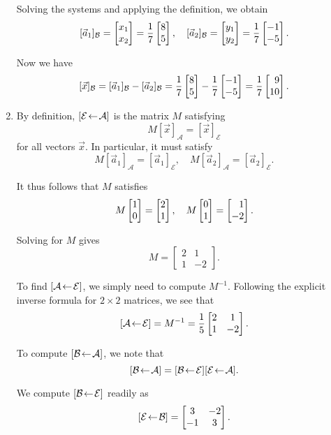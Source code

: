 \begin{exercises}
\begin{problist}
\begin{solution}
\begin{enumerate}
				Solving the systems and applying the definition, we obtain
				\[
					[\vec a_1]_{\mathcal B}=\mat{x_1\\x_2}=\frac{1}{7}\mat{8\\5},\quad
					[\vec a_2]_{\mathcal B}=\mat{y_1\\y_2}=\frac{1}{7}\mat{-1\\-5}.
				\]
				
				Now we have
				\[
					[\vec x]_{\mathcal B}=[\vec a_1]_{\mathcal B}-[\vec a_2]_{\mathcal B}=\frac{1}{7}\mat{8\\5}-\frac{1}{7}\mat{-1\\-5}=\frac{1}{7}\mat{9\\10}.
				\]
				\item By definition, $\BasisChange{\mathcal A}{\mathcal E}$ is the matrix $M$ satisfying
				\[
					M[\vec x]_{\mathcal A}=[\vec x]_{\mathcal E}
				\]
				for all vectors $\vec x$. In particular, it must satisfy
				\[
					M[\vec a_1]_{\mathcal A}=[\vec a_1]_{\mathcal E},\quad
					M[\vec a_2]_{\mathcal A}=[\vec a_2]_{\mathcal E}.
				\]
				
				It thus follows that $M$ satisfies
				\[
					M\mat{1\\0}=\mat{2\\1},\quad
					M\mat{0\\1}=\mat{1\\-2}.
				\]
				
				Solving for $M$ gives
				\[
					M=
					\begin{bmatrix}
						2 & 1 \\ 1 & -2
					\end{bmatrix}.
				\]
				
				To find $\BasisChange{\mathcal E}{\mathcal A}$, we simply need to compute $M^{-1}$.
				Following the explicit inverse formula for $2\times2$ matrices, we see that
				\[
					\BasisChange{\mathcal E}{\mathcal A}=M^{-1}=\frac{1}{5}
					\begin{bmatrix}
						2 & 1 \\ 1 & -2
					\end{bmatrix}.
				\]
				
				To compute $\BasisChange{\mathcal A}{\mathcal B}$, we note that
				\[
					\BasisChange{\mathcal A}{\mathcal B}=\BasisChange{\mathcal E}{\mathcal B}\BasisChange{\mathcal A}{\mathcal E}.
				\]
				
				We compute $\BasisChange{\mathcal E}{\mathcal B}$ readily as
				\[
					\BasisChange{\mathcal B}{\mathcal E}=
					\begin{bmatrix}
						3 & -2 \\ -1 & 3
					\end{bmatrix}.
				\]
				

\end{enumerate}
\end{solution}
\end{problist}
\end{exercises}

